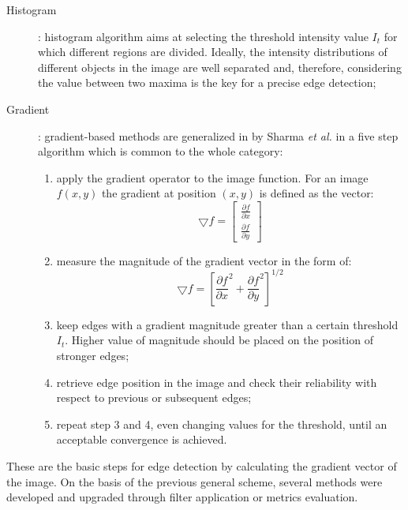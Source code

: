 \documentclass[../main.tex]{subfiles}
\begin{document}
\begin{description}
\item[Histogram] : histogram algorithm aims at selecting the threshold intensity value $I_{t}$ for which different regions are divided. Ideally, the intensity distributions of different objects in the image are well separated and, therefore, considering the value between two maxima is the key for a precise edge detection; 
\item[Gradient] : gradient-based methods are generalized in \cite{automated_segm_tech} by Sharma \textit{et al.} in a five step algorithm which is common to the whole category:
          \begin{enumerate}
               \item apply the gradient operator to the image function. For an image $f(x,y)$ the gradient at position $(x,y)$ is defined as the vector:
               \begin{equation}
               \bigtriangledown f = \begin{bmatrix}
                                            \frac{\partial f}{\partial x} \\
                                            \frac{\partial f}{\partial y}
                                        \end{bmatrix}
               \end{equation}
               \item measure the magnitude of the gradient vector in the form of:
               \begin{equation}
                     \bigtriangledown f = \left[ \frac{\partial f}{\partial x}^{2} + \frac{\partial f}{\partial y}^{2} \right]^{1/2}
               \end{equation}
               \item keep edges with a gradient magnitude greater than a certain threshold $I_{t}$.  Higher value of magnitude should be placed on the position of stronger edges;
               \item retrieve edge position in the image and check their reliability with respect to previous or subsequent edges;
               \item repeat step 3 and 4, even changing values for the threshold, until an acceptable convergence is achieved.
           \end{enumerate}
\end{description}
These are the basic steps for edge detection by calculating the gradient vector of the image. On the basis of the previous general scheme, several methods were developed and upgraded through filter application or metrics evaluation.
\end{document}
